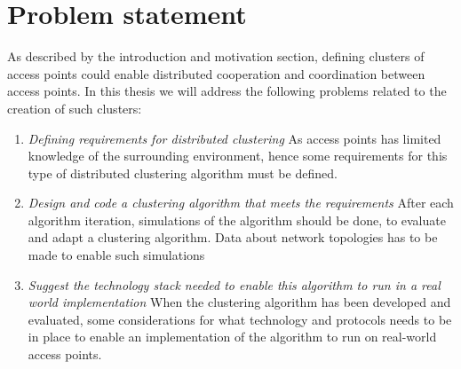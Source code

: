 \section{Problem statement}
As described by the introduction and motivation section, defining clusters of access points could enable distributed
cooperation and coordination between access points. In this thesis we will address the following problems related to the creation of such clusters:
\begin{enumerate}
	\item	\textit{Defining requirements for distributed clustering}\newline
		As access points has limited knowledge of the surrounding environment, hence some requirements 
		for this type of distributed clustering algorithm must be defined.  

	\item \textit{Design and code a clustering algorithm that meets the requirements}\newline
		After each algorithm iteration, simulations of the algorithm should be done, to evaluate and adapt a clustering algorithm.
		Data about network topologies has to be made to enable such simulations
		
	\item \textit{Suggest the technology stack needed to enable this algorithm to run in a real world implementation }\newline
		When the clustering algorithm has been developed and evaluated, some considerations for what technology and protocols needs to be in place to enable
		an implementation of the algorithm to run on real-world access points. 
\end{enumerate}

